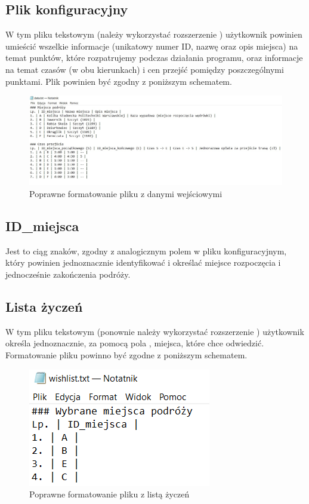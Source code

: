 \documentclass[12pt,a4paper]{article}
\begin{document}
\subsection{Plik konfiguracyjny}
W tym pliku tekstowym (należy wykorzystać rozszerzenie ) użytkownik powinien umieścić wszelkie informacje (unikatowy numer ID, nazwę oraz opis miejsca) na temat punktów, które rozpatrujemy podczas działania programu, oraz informacje na temat czasów (w obu kierunkach) i cen przejść pomiędzy poszczególnymi punktami. Plik powinien być zgodny z poniższym schematem.
\begin{figure}[h!]
\includegraphics[width = \linewidth]{data.jpg}
\caption{Poprawne formatowanie pliku z danymi wejściowymi}
\end{figure}
\subsection{ID\_miejsca}
Jest to ciąg znaków, zgodny z analogicznym polem w pliku konfiguracyjnym, który powinien jednoznacznie identyfikować i określać miejsce rozpoczęcia i jednocześnie zakończenia podróży.
\newpage
\subsection{Lista życzeń}
W tym pliku tekstowym (ponownie należy wykorzystać rozszerzenie ) użytkownik określa jednoznacznie, za pomocą pola , miejsca, które chce odwiedzić. Formatowanie pliku powinno być zgodne z poniższym schematem.\\
\begin{figure}[h!]
\includegraphics[scale = 1.1]{wishlist.jpg}
\caption{Poprawne formatowanie pliku z listą życzeń}
\end{figure}
\newpage
\end{document}
